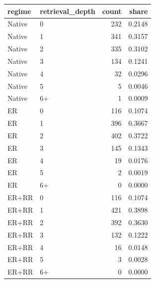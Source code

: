 \begin{tabular}{llrr}
\toprule
regime & retrieval_depth & count & share \\
\midrule
Native & 0 & 232 & 0.2148 \\
Native & 1 & 341 & 0.3157 \\
Native & 2 & 335 & 0.3102 \\
Native & 3 & 134 & 0.1241 \\
Native & 4 & 32 & 0.0296 \\
Native & 5 & 5 & 0.0046 \\
Native & 6+ & 1 & 0.0009 \\
ER & 0 & 116 & 0.1074 \\
ER & 1 & 396 & 0.3667 \\
ER & 2 & 402 & 0.3722 \\
ER & 3 & 145 & 0.1343 \\
ER & 4 & 19 & 0.0176 \\
ER & 5 & 2 & 0.0019 \\
ER & 6+ & 0 & 0.0000 \\
ER+RR & 0 & 116 & 0.1074 \\
ER+RR & 1 & 421 & 0.3898 \\
ER+RR & 2 & 392 & 0.3630 \\
ER+RR & 3 & 132 & 0.1222 \\
ER+RR & 4 & 16 & 0.0148 \\
ER+RR & 5 & 3 & 0.0028 \\
ER+RR & 6+ & 0 & 0.0000 \\
\bottomrule
\end{tabular}
